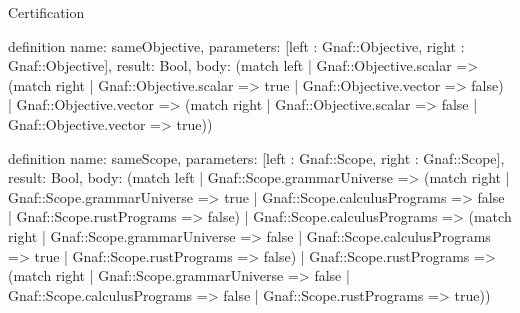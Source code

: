 \begin{lexlean}{Certification}
\begin{semanticmodule}
definition{
  name: sameObjective,
  parameters: [left : Gnaf::Objective, right : Gnaf::Objective],
  result: Bool,
  body: (match left
    | Gnaf::Objective.scalar => (match right
      | Gnaf::Objective.scalar => true
      | Gnaf::Objective.vector => false)
    | Gnaf::Objective.vector => (match right
      | Gnaf::Objective.scalar => false
      | Gnaf::Objective.vector => true))
}

definition{
  name: sameScope,
  parameters: [left : Gnaf::Scope, right : Gnaf::Scope],
  result: Bool,
  body: (match left
    | Gnaf::Scope.grammarUniverse => (match right
      | Gnaf::Scope.grammarUniverse => true
      | Gnaf::Scope.calculusPrograms => false
      | Gnaf::Scope.rustPrograms => false)
    | Gnaf::Scope.calculusPrograms => (match right
      | Gnaf::Scope.grammarUniverse => false
      | Gnaf::Scope.calculusPrograms => true
      | Gnaf::Scope.rustPrograms => false)
    | Gnaf::Scope.rustPrograms => (match right
      | Gnaf::Scope.grammarUniverse => false
      | Gnaf::Scope.calculusPrograms => false
      | Gnaf::Scope.rustPrograms => true))
}


\end{semanticmodule}
\end{lexlean}
